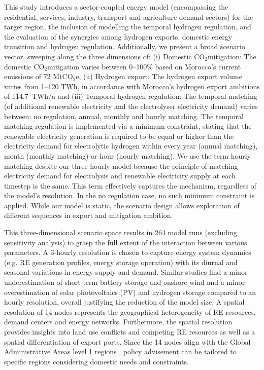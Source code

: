 \documentclass[5p,numafflabel]{elsarticle}
\newcommand{\co}{\ce{CO2}~}
\def\co{CO${}_2${\:}}
\def\coe{CO${}_2$e}
\begin{document}
This study introduces a sector-coupled energy model (encompassing the residential, services, industry, transport and agriculture demand sectors) for the target region, the inclusion of modelling the temporal hydrogen regulation, and the evaluation of the synergies among hydrogen exports, domestic energy transition and hydrogen regulation.
Additionally, we present a broad scenario vector, sweeping along the three dimensions of:
(i) Domestic \co mitigation: The domestic \co mitigation varies between 0--100\% based on Morocco's current emissions of 72 Mt\coe,
(ii) Hydrogen export: The hydrogen export volume varies from 1--120 TWh, in accordance with Morocco's hydrogen export ambitions of 114.7~TWh/a and
(iii) Temporal hydrogen regulation: The temporal matching (of additional renewable electricity and the electrolyser electricity demand) varies between: no regulation, annual, monthly and hourly matching. The temporal matching regulation is implemented via a minimum constraint, stating that the renewable electricity generation is required to be equal or higher than the electricity demand for electrolytic hydrogen within every year (annual matching), month (monthly matching) or hour (hourly matching). 
We use the term hourly matching despite our three-hourly model because the principle of matching electricity demand for electrolysis and renewable electricity supply at each timestep is the same. This term effectively captures the mechanism, regardless of the model’s resolution. In the no regulation case, no such minimum constraint is applied.
While our model is static, the scenario design allows exploration of different sequences in export and mitigation ambition.

This three-dimensional scenario space results in 264 model runs (excluding sensitivity analysis) to grasp the full extent of the interaction between various parameters.
A 3-hourly resolution is chosen to capture energy system dynamics (e.g. RE generation profiles, energy storage operation) with its diurnal and seasonal variations in energy supply and demand. Similar studies \cite{Neumann2022, Schlachtberger2018} find a minor underestimation of short-term battery storage and onshore wind and a minor overestimation of solar photovoltaics (PV) and hydrogen storage compared to an hourly resolution, overall justifying the reduction of the model size. 
A spatial resolution of 14 nodes represents the geographical heterogeneity of RE resources, demand centers and energy networks. Furthermore, the spatial resolution provides insights into land use conflicts and competing RE resources as well as a spatial differentiation of export ports. Since the 14 nodes align with the Global Administrative Areas level 1 regions \cite{gadm2022}, policy advisement can be tailored to specific regions considering domestic needs and constraints.
\end{document}
